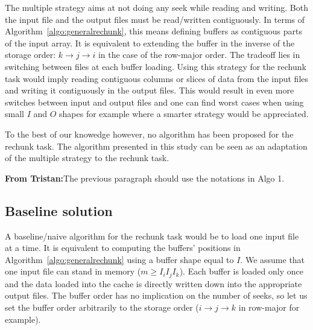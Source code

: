 \documentclass[conference]{IEEEtran}
\newcommand{\tristan}[1]{\color{orange}\textbf{From Tristan:}#1\color{black}}
\begin{document}
The multiple strategy aims at not doing any seek while reading and writing.
Both the input file and the output files must be read/written contiguously. In
terms of Algorithm~\ref{algo:generalrechunk}, this means defining buffers as
contiguous parts of the input array. It is equivalent to extending the buffer
in the inverse of the storage order: $k \rightarrow j \rightarrow i$ in the case
of the row-major order. The tradeoff lies in switching between files
at each buffer loading. Using this strategy for the rechunk task would imply
reading contiguous columns or slices of data from the input files and writing it
contiguously in the output files. This would result in even more switches
between input and output files and one can find worst cases when using small
$I$ and $O$ shapes for example where a smarter strategy would be appreciated.

To the best of our knowedge however, no algorithm has been proposed for the
rechunk task. The algorithm presented in this study can be seen as an
adaptation of the multiple strategy to the rechunk task.

\tristan{The previous paragraph should use the notations in Algo 1.}

\subsection{Baseline solution}

A baseline/naive algorithm for the rechunk task would be to load one input file
at a time. It is equivalent to computing the buffers' positions in
Algorithm~\ref{algo:generalrechunk} using a buffer shape equal to $I$.
We assume that one input file can stand in memory ($m \geq I_iI_jI_k$). Each
buffer is loaded only once and the data loaded into the cache is directly
written down into the appropriate output files. The buffer order has no
implication on the number of seeks, so let us set the buffer order arbitrarily
to the storage order ($i \rightarrow j \rightarrow k$ in row-major for example).
\end{document}
